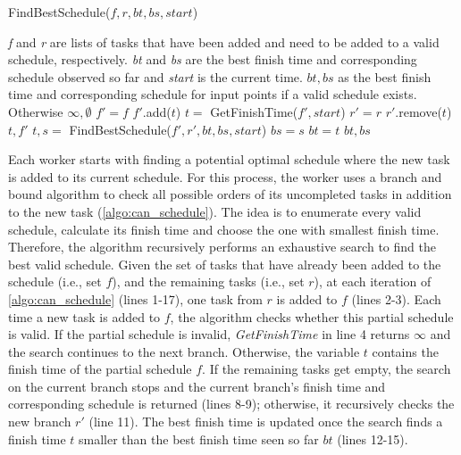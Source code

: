 \begin{algorithm}[!ht]
	\caption{FindBestSchedule($f, r, bt, bs, start$)}
	\label{algo:can_schedule}
	\begin{algorithmic}[1]
		\REQUIRE \emph{f} and \emph{r} are lists of tasks that have been added and need to be added to a valid schedule, respectively. \emph{bt} and \emph{bs} are the best finish time and corresponding schedule observed so far and \emph{start} is the current time.
		\ENSURE $bt, bs$ as the best finish time and corresponding schedule for input points if a valid schedule exists. Otherwise $\infty, \emptyset$
			\STATE $f' = f$
			\STATE $f'$.add($t$)
			\STATE $t =$ GetFinishTime($f', start$)
				\STATE $r' = r$
				\STATE $r'$.remove($t$)
					\RETURN $t, f'$
				\ENDIF
				\STATE $t, s =$ FindBestSchedule($f', r', bt, bs, start$)
					\STATE $bs = s$
					\STATE $bt = t$
				\ENDIF
			\ENDIF
		\ENDFOR
		\RETURN $bt, bs$
	\end{algorithmic} \vspace{-1mm}
\end{algorithm}

Each worker starts with finding a potential optimal schedule where the new task is added to its current schedule. For this process, the worker uses a branch and bound algorithm to check all possible orders of its uncompleted tasks in addition to the new task (\cref{algo:can_schedule}). The idea is to enumerate every valid schedule, calculate its finish time and choose the one with smallest finish time. Therefore, the algorithm recursively performs an exhaustive search to find the best valid schedule. Given the set of tasks that have already been added to the schedule (i.e., set $f$), and the remaining tasks (i.e., set $r$), at each iteration of \cref{algo:can_schedule} (lines 1-17), one task from $r$ is added to $f$ (lines 2-3). Each time a new task is added to $f$, the algorithm checks whether this partial schedule is valid. If the partial schedule is invalid, \textit{GetFinishTime} in line 4 returns $\infty$ and the search continues to the next branch. Otherwise, the variable $t$ contains the finish time of the partial schedule $f$. If the remaining tasks get empty, the search on the current branch stops and the current branch's finish time and corresponding schedule is returned (lines 8-9); otherwise, it recursively checks the new branch $r'$ (line 11). The best finish time is updated once the search finds a finish time $t$ smaller than the best finish time seen so far $bt$ (lines 12-15).

